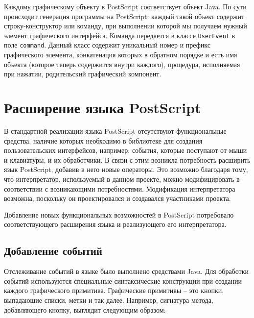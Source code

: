 \documentclass[14pt]{matmex-diploma}
\begin{document}
Каждому графическому объекту в PostScript соответствует объект Java. По сути происходит генерация программы на PostScript: каждый такой объект содержит строку-конструктор или команду, при выполнении которой мы получаем нужный элемент графического интерфейса. Команда передается в классе \texttt{UserEvent} в поле \texttt{command}. Данный класс содержит уникальный номер и префикс графического элемента, конкатенация которых в обратном порядке и есть имя объекта (которое теперь содержится внутри каждого), процедура, исполняемая при нажатии, родительский графический компонент.




\section{Расширение языка PostScript}
В стандартной реализации языка PostScript отсутствуют функциональные средства, наличие которых необходимо в библиотеке для создания пользовательских интерфейсов, например, события, которые поступают от мыши и клавиатуры, и их обработчики. В связи с этим возникла потребность расширить язык PostScript, добавив в него новые операторы. Это возможно благодаря тому, что интерпретатор, используемый в данном проекте, можно модифицировать в соответствии с возникающими потребностями. Модификация интерпретатора возможна, поскольку он проектировался и создавался  участниками проекта.

Добавление новых функциональных возможностей в PostScript потребовало соответствующего расширения языка и реализующего его интерпретатора. 

\subsection{Добавление событий}
Отслеживание событий в языке было выполнено средствами Java. Для обработки событий используются специальные синтаксические конструкции при создании каждого графического примитива. Графические примитивы -- это кнопки, выпадающие списки, метки и так далее. Например, сигнатура метода, добавляющего кнопку, выглядит следующим образом:\\
\end{document}
